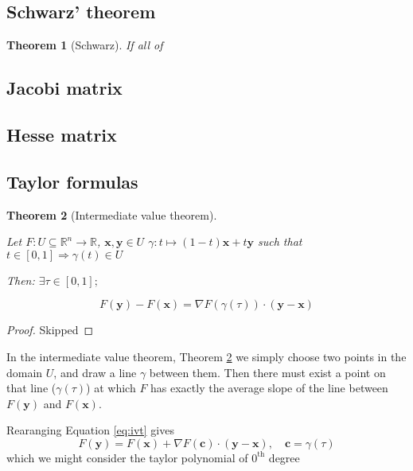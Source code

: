 \documentclass{article}
\theoremstyle{plain}
\newtheorem{theorem}{Theorem}
\begin{document}
\subsection{Schwarz' theorem}

\begin{theorem}[Schwarz]
    If all of 
    
\end{theorem}

\subsection{Jacobi matrix}

\subsection{Hesse matrix}

\subsection{Taylor formulas}

\begin{theorem}[Intermediate value theorem]
    \label{th:ivt}

    Let $F: U \subseteq \mathbb R^n \rightarrow \mathbb R$, $\mathbf x, \mathbf y \in U$
    $\gamma: t \mapsto (1-t) \mathbf x + t \mathbf y$ such that $ t \in [0, 1] \Rightarrow \gamma(t) \in U$

    Then: $\exists \tau \in [0, 1];$

    \begin{equation}\label{eq:ivt}
        F(\mathbf y) - F(\mathbf x) = \nabla F(\gamma(\tau)) \cdot (\mathbf y - \mathbf x)        
    \end{equation}
    
\end{theorem}

\begin{proof}
    Skipped
\end{proof}

In the intermediate value theorem, Theorem \ref{th:ivt} we simply choose two points in the
domain $U$, and draw a line $\gamma$ between them. Then there must
exist a point on that line ($\gamma(\tau)$) at which $F$ has exactly the average slope of the line between 
$F(\mathbf y)$ and $ F(\mathbf x)$.

Rearanging Equation \ref{eq:ivt} gives 
$$F(\mathbf y) = F(\mathbf x) + \nabla F(\mathbf c) \cdot (\mathbf y - \mathbf x), \quad \mathbf c = \gamma(\tau)$$
which we might consider the taylor polynomial of $0^{\textrm{th}}$ degree
\end{document}
